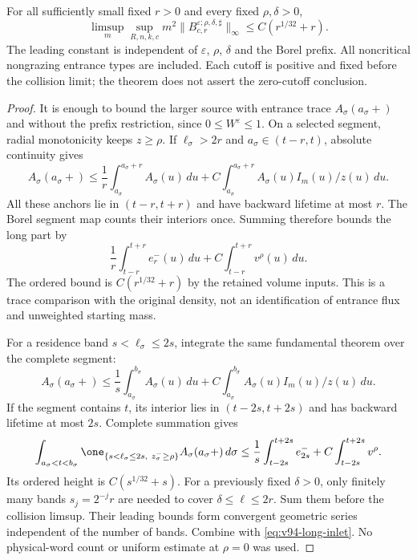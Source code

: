 \begin{theorem}
\label{thm:v94-entrance-height}
For all sufficiently small fixed $r>0$ and every fixed
$\rho,\delta>0$,
\begin{equation}\label{eq:v94-entrance-height}
 \limsup_m\sup_{R,n,k,c}m^2
 \|B_{c,r}^{\varepsilon;\rho,\delta,\sharp}\|_\infty
                           \le C(r^{1/32}+r).
\end{equation}
The leading constant is independent of $\varepsilon$, $\rho$, $\delta$
and the Borel prefix. All noncritical nongrazing entrance types are
included. Each cutoff is positive and fixed before the collision
limit; the theorem does not assert the zero-cutoff conclusion.
\end{theorem}
\begin{proof}
It is enough to bound the larger source with entrance trace
$A_\sigma(a_\sigma+)$ and without the prefix restriction, since
$0\le W^\varepsilon\le1$. On a selected segment, radial monotonicity
keeps $z\ge\rho$. If $\ell_\sigma>2r$ and $a_\sigma\in(t-r,t)$,
absolute continuity gives
\[
 A_\sigma(a_\sigma+)\le
 \frac1r\int_{a_\sigma}^{a_\sigma+r}A_\sigma(u)\,du
 +C\int_{a_\sigma}^{a_\sigma+r}A_\sigma(u)I_m(u)/z(u)\,du.
\]
All these anchors lie in $(t-r,t+r)$ and have backward lifetime at
most $r$. The Borel segment map counts their interiors once. Summing
therefore bounds the long part by
\begin{equation}\label{eq:v94-long-inlet}
 \frac1r\int_{t-r}^{t+r}e_r^-(u)\,du
                         +C\int_{t-r}^{t+r}v^\rho(u)\,du.
\end{equation}
The ordered bound is $C(r^{1/32}+r)$ by the retained volume inputs.
This is a trace comparison with the original density, not an
identification of entrance flux and unweighted starting mass.

For a residence band $s<\ell_\sigma\le2s$, integrate the same
fundamental theorem over the complete segment:
\[
 A_\sigma(a_\sigma+)\le
 \frac1s\int_{a_\sigma}^{b_\sigma}A_\sigma(u)\,du
                  +C\int_{a_\sigma}^{b_\sigma}A_\sigma(u)I_m(u)/z(u)\,du.
\]
If the segment contains $t$, its interior lies in $(t-2s,t+2s)$ and
has backward lifetime at most $2s$. Complete summation gives
\begin{equation}\label{eq:v94-band-inlet}
 \int_{a_\sigma<t<b_\sigma}\one_{\{s<\ell_\sigma\le2s,\ z_\sigma^-\ge\rho\}}
          A_\sigma(a_\sigma+)\,d\sigma
 \le\frac1s\int_{t-2s}^{t+2s}e_{2s}^-+C\int_{t-2s}^{t+2s}v^\rho.
\end{equation}
Its ordered height is $C(s^{1/32}+s)$. For a previously fixed
$\delta>0$, only finitely many bands $s_j=2^{-j}r$ are needed to
cover $\delta\le\ell\le2r$. Sum them before the collision limsup.
Their leading bounds form convergent geometric series independent
of the number of bands. Combine with \eqref{eq:v94-long-inlet}.
No physical-word count or uniform estimate at $\rho=0$ was used.
\end{proof}

